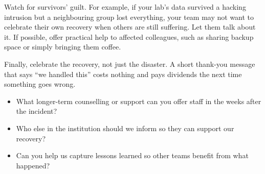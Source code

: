 \documentclass[10pt,letterpaper]{article}
\begin{document}
Watch for survivors' guilt.  For example, if your lab's data survived a hacking
intrusion but a neighbouring group lost everything, your team may not want to
celebrate their own recovery when others are still suffering.  Let them talk
about it. If possible, offer practical help to affected colleagues, such as
sharing backup space or simply bringing them coffee.

Finally, celebrate the recovery, not just the disaster. A short thank-you
message that says ``we handled this'' costs nothing and pays dividends the next
time something goes wrong.

\begin{notebox}
  \begin{itemize}
  \item What longer-term counselling or support can you offer staff in the weeks
    after the incident?
  \item Who else in the institution should we inform so they can support our
    recovery?
  \item Can you help us capture lessons learned so other teams benefit from what
    happened?
  \end{itemize}
\end{notebox}
\end{document}
